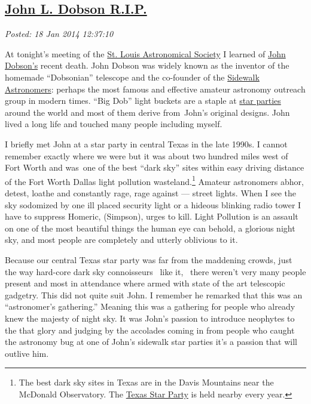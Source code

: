 %

\subsection*{\href{https://bakerjd99.wordpress.com/2014/01/18/john-l-dobson-r-i-p/}{John L. Dobson R.I.P.}}


\noindent\emph{Posted: 18 Jan 2014 12:37:10}
\vspace{6pt}

At tonight's meeting of the \href{http://www.slasonline.org/}{St. Louis
Astronomical Society} I learned of
\href{http://www.universetoday.com/108150/john-dobson-inventor-of-the-popular-dobsonian-telescope-dead-at-98/}{John
Dobson's} recent death. John Dobson was widely known as the inventor of
the homemade ``Dobsonian'' telescope and the co-founder of the
\href{http://www.sidewalkastronomers.us/}{Sidewalk Astronomers}: perhaps
the most famous and effective amateur astronomy outreach group in modern
times. ``Big Dob'' light buckets are a staple at
\href{http://stardate.org/nightsky/star\_parties}{star parties} around
the world and most of them derive from~John's original designs. John
lived a long life and touched many people including myself.

I briefly met John at a star party in central Texas in the late 1990s.
I cannot remember exactly where we were but it was about two hundred
miles west of Fort Worth and was~one of the best ``dark sky'' sites
within easy driving distance of the Fort Worth Dallas light pollution
wasteland.\footnote{
The best dark sky sites in
Texas are in the Davis Mountains near the McDonald Observatory. The
\href{http://texasstarparty.org/}{Texas Star Party} is held nearby every year.
} Amateur astronomers
abhor, detest, loathe and constantly rage, rage against --- street
lights. When I see the sky sodomized by one ill placed security light or
a hideous blinking radio tower I have to suppress Homeric, (Simpson),
urges to kill. Light Pollution is an assault on one of the most
beautiful things the human eye can behold, a glorious night sky, and
most people are completely and utterly oblivious to it.

Because our central Texas star party was far from the maddening crowds,
just the way hard-core dark sky connoisseurs ~like it, ~there weren't
very many people present and most in attendance where armed with state
of the art telescopic gadgetry. This did not quite suit John. I remember
he remarked that this was an ``astronomer's gathering.'' Meaning this
was a gathering for people who already knew the majesty of night sky. It
was John's passion to introduce neophytes to the that glory and judging
by the accolades coming in from people who caught the astronomy bug at
one of John's sidewalk star parties it's a passion that will outlive
him.

